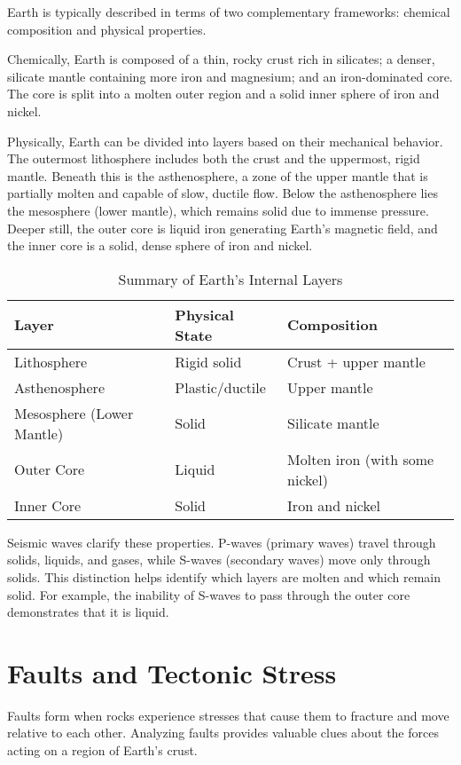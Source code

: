 \documentclass{article}
\begin{document}
Earth is typically described in terms of two complementary frameworks: chemical composition and physical properties.

Chemically, Earth is composed of a thin, rocky crust rich in silicates; a denser, silicate mantle containing more iron and magnesium; and an iron-dominated core. The core is split into a molten outer region and a solid inner sphere of iron and nickel.

Physically, Earth can be divided into layers based on their mechanical behavior. The outermost lithosphere includes both the crust and the uppermost, rigid mantle. Beneath this is the asthenosphere, a zone of the upper mantle that is partially molten and capable of slow, ductile flow. Below the asthenosphere lies the mesosphere (lower mantle), which remains solid due to immense pressure. Deeper still, the outer core is liquid iron generating Earth's magnetic field, and the inner core is a solid, dense sphere of iron and nickel.

\begin{table}[h!]
\centering
\begin{tabular}{|l|l|l|}
\hline
\textbf{Layer} & \textbf{Physical State} & \textbf{Composition} \\
\hline
Lithosphere & Rigid solid & Crust + upper mantle \\
Asthenosphere & Plastic/ductile & Upper mantle \\
Mesosphere (Lower Mantle) & Solid & Silicate mantle \\
Outer Core & Liquid & Molten iron (with some nickel) \\
Inner Core & Solid & Iron and nickel \\
\hline
\end{tabular}
\caption{Summary of Earth's Internal Layers}
\end{table}

Seismic waves clarify these properties. P-waves (primary waves) travel through solids, liquids, and gases, while S-waves (secondary waves) move only through solids. This distinction helps identify which layers are molten and which remain solid. For example, the inability of S-waves to pass through the outer core demonstrates that it is liquid.

\section*{Faults and Tectonic Stress}

Faults form when rocks experience stresses that cause them to fracture and move relative to each other. Analyzing faults provides valuable clues about the forces acting on a region of Earth's crust.
\end{document}

